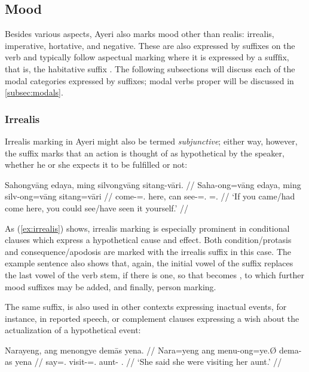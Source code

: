 \subsection{Mood}

Besides various aspects, Ayeri also marks mood other than realis: irrealis, 
imperative, hortative, and negative. These are also expressed by suffixes on the 
verb and typically follow aspectual marking where it is expressed by a sufffix, 
that is, the habitative suffix . The following subsections will 
discuss each of the modal categories expressed by suffixes; modal verbs proper 
will be discussed in \autoref{subsec:modals}.

\subsubsection{Irrealis}

Irrealis marking in Ayeri might also be termed \emph{subjunctive}; either way, 
however, the suffix  marks that an action is thought of as 
hypothetical by the speaker, whether he or she expects it to be fulfilled or 
not:

\ex\label{ex:irrealis}\begingl
	\gla Sahongvāng edaya, ming silvongvāng sitang-vāri. //
	\glb Saha-ong=vāng edaya, ming silv-ong=vāng sitang=vāri //
	\glb come-\Irr{}=\Ssg{}.\Aarg{} here, can see-\Irr{}=\Ssg{}.\Aarg{} 
		\Refl{}=\Ssg{}.\Ins{} //
	\glft `If you came/had come here, you could see/have seen it  
		yourself.' //
\endgl\xe

As (\ref{ex:irrealis}) shows, irrealis marking is especially prominent in 
conditional clauses which express a hypothetical cause and effect. Both 
condition/protasis and consequence/apodosis are marked with the irrealis suffix 
in this case. The example sentence also shows that, again, the initial vowel of 
the suffix replaces the last vowel of the verb stem, if there is one, so that 
 becomes , to which further mood suffixes 
may be added, and finally, person marking.

The same suffix,  is also used in other contexts expressing 
inactual events, for instance, in reported speech, or complement clauses 
expressing a wish about the actualization of a hypothetical event:

\ex\begingl
	\gla Narayeng, ang menongye demās yena. //
	\glb Nara=yeng ang menu-ong=ye.Ø dema-as yena //
	\glc say=\TsgF{}.\Aarg{} \AgtT{} visit-\Irr{}=\TsgF{}.\Top{} 
		aunt-\Parg{} \TsgF{}.\Gen{} //
	\glft `She said she were visiting her aunt.' //
\endgl\xe


